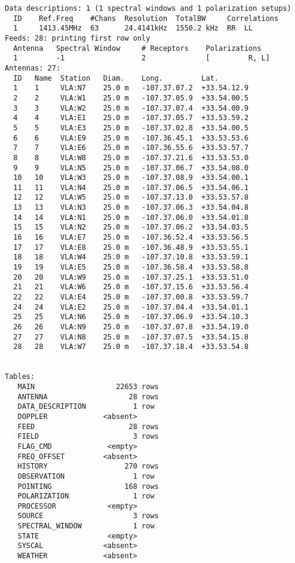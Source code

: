 \begin{verbatim}
Data descriptions: 1 (1 spectral windows and 1 polarization setups)
  ID    Ref.Freq    #Chans  Resolution  TotalBW     Correlations
  1     1413.45MHz  63      24.4141kHz  1550.2 kHz  RR  LL
Feeds: 28: printing first row only
  Antenna   Spectral Window     # Receptors    Polarizations
  1         -1                  2              [         R, L]
Antennas: 27:
  ID   Name  Station   Diam.    Long.         Lat.
  1    1     VLA:N7    25.0 m   -107.37.07.2  +33.54.12.9
  2    2     VLA:W1    25.0 m   -107.37.05.9  +33.54.00.5
  3    3     VLA:W2    25.0 m   -107.37.07.4  +33.54.00.9
  4    4     VLA:E1    25.0 m   -107.37.05.7  +33.53.59.2
  5    5     VLA:E3    25.0 m   -107.37.02.8  +33.54.00.5
  6    6     VLA:E9    25.0 m   -107.36.45.1  +33.53.53.6
  7    7     VLA:E6    25.0 m   -107.36.55.6  +33.53.57.7
  8    8     VLA:W8    25.0 m   -107.37.21.6  +33.53.53.0
  9    9     VLA:N5    25.0 m   -107.37.06.7  +33.54.08.0
  10   10    VLA:W3    25.0 m   -107.37.08.9  +33.54.00.1
  11   11    VLA:N4    25.0 m   -107.37.06.5  +33.54.06.1
  12   12    VLA:W5    25.0 m   -107.37.13.0  +33.53.57.8
  13   13    VLA:N3    25.0 m   -107.37.06.3  +33.54.04.8
  14   14    VLA:N1    25.0 m   -107.37.06.0  +33.54.01.8
  15   15    VLA:N2    25.0 m   -107.37.06.2  +33.54.03.5
  16   16    VLA:E7    25.0 m   -107.36.52.4  +33.53.56.5
  17   17    VLA:E8    25.0 m   -107.36.48.9  +33.53.55.1
  18   18    VLA:W4    25.0 m   -107.37.10.8  +33.53.59.1
  19   19    VLA:E5    25.0 m   -107.36.58.4  +33.53.58.8
  20   20    VLA:W9    25.0 m   -107.37.25.1  +33.53.51.0
  21   21    VLA:W6    25.0 m   -107.37.15.6  +33.53.56.4
  22   22    VLA:E4    25.0 m   -107.37.00.8  +33.53.59.7
  24   24    VLA:E2    25.0 m   -107.37.04.4  +33.54.01.1
  25   25    VLA:N6    25.0 m   -107.37.06.9  +33.54.10.3
  26   26    VLA:N9    25.0 m   -107.37.07.8  +33.54.19.0
  27   27    VLA:N8    25.0 m   -107.37.07.5  +33.54.15.8
  28   28    VLA:W7    25.0 m   -107.37.18.4  +33.53.54.8


Tables:
   MAIN                   22653 rows
   ANTENNA                   28 rows
   DATA_DESCRIPTION           1 row
   DOPPLER             <absent>
   FEED                      28 rows
   FIELD                      3 rows
   FLAG_CMD             <empty>
   FREQ_OFFSET         <absent>
   HISTORY                  270 rows
   OBSERVATION                1 row
   POINTING                 168 rows
   POLARIZATION               1 row
   PROCESSOR            <empty>
   SOURCE                     3 rows
   SPECTRAL_WINDOW            1 row
   STATE                <empty>
   SYSCAL              <absent>
   WEATHER             <absent>
\end{verbatim}
\normalsize

